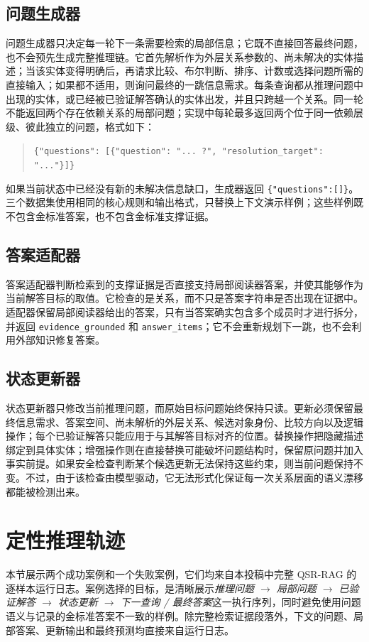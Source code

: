 \documentclass[11pt]{article}
\begin{document}
	\subsection{问题生成器}
	问题生成器只决定每一轮下一条需要检索的局部信息；它既不直接回答最终问题，也不会预先生成完整推理链。它首先解析作为外层关系参数的、尚未解决的实体描述；当该实体变得明确后，再请求比较、布尔判断、排序、计数或选择问题所需的直接输入；如果都不适用，则询问最终的一跳信息需求。每条查询都从推理问题中出现的实体，或已经被已验证解答确认的实体出发，并且只跨越一个关系。同一轮不能返回两个存在依赖关系的局部问题；实现中每轮最多返回两个位于同一依赖层级、彼此独立的问题，格式如下：
	\begin{quote}\small
		\texttt{\{"questions": [\{"question": "... ?", "resolution\_target": "..."\}]\}}
	\end{quote}
	如果当前状态中已经没有新的未解决信息缺口，生成器返回 \texttt{\{"questions":[]\}}。三个数据集使用相同的核心规则和输出格式，只替换上下文演示样例；这些样例既不包含金标准答案，也不包含金标准支撑证据。

	\subsection{答案适配器}
	答案适配器判断检索到的支撑证据是否直接支持局部阅读器答案，并使其能够作为当前解答目标的取值。它检查的是关系，而不只是答案字符串是否出现在证据中。适配器保留局部阅读器给出的答案，只有当答案确实包含多个成员时才进行拆分，并返回 \texttt{evidence\_grounded} 和 \texttt{answer\_items}；它不会重新规划下一跳，也不会利用外部知识修复答案。

	\subsection{状态更新器}
	状态更新器只修改当前推理问题，而原始目标问题始终保持只读。更新必须保留最终信息需求、答案空间、尚未解析的外层关系、候选对象身份、比较方向以及逻辑操作；每个已验证解答只能应用于与其解答目标对齐的位置。替换操作把隐藏描述绑定到具体实体；增强操作则在直接替换可能破坏问题结构时，保留原问题并加入事实前提。如果安全检查判断某个候选更新无法保持这些约束，则当前问题保持不变。不过，由于该检查由模型驱动，它无法形式化保证每一次关系层面的语义漂移都能被检测出来。


	\section{定性推理轨迹}
	\label{app:cases}

	本节展示两个成功案例和一个失败案例，它们均来自本投稿中完整 QSR-RAG 的逐样本运行日志。案例选择的目标，是清晰展示\emph{推理问题 $\rightarrow$ 局部问题 $\rightarrow$ 已验证解答 $\rightarrow$ 状态更新 $\rightarrow$ 下一查询 / 最终答案}这一执行序列，同时避免使用问题语义与记录的金标准答案不一致的样例。除完整检索证据段落外，下文的问题、局部答案、更新输出和最终预测均直接来自运行日志。
\end{document}
